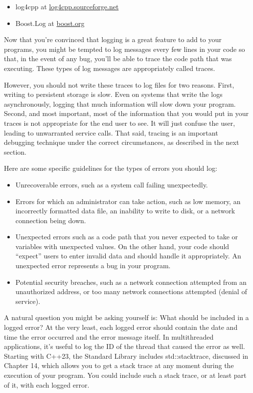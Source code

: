 \begin{itemize}
\item
log4cpp at \url{log4cpp.sourceforge.net}

\item
Boost.Log at \url{boost.org}
\end{itemize}

Now that you’re convinced that logging is a great feature to add to your programs, you might be tempted to log messages every few lines in your code so that, in the event of any bug, you’ll be able to trace the code path that was executing. These types of log messages are appropriately called traces.

However, you should not write these traces to log files for two reasons. First, writing to persistent storage is slow. Even on systems that write the logs asynchronously, logging that much information will slow down your program. Second, and most important, most of the information that you would put in your traces is not appropriate for the end user to see. It will just confuse the user, leading to unwarranted service calls. That said, tracing is an important debugging technique under the correct circumstances, as described in the next section.

Here are some specific guidelines for the types of errors you should log:

\begin{itemize}
\item
Unrecoverable errors, such as a system call failing unexpectedly.

\item
Errors for which an administrator can take action, such as low memory, an incorrectly formatted data file, an inability to write to disk, or a network connection being down.

\item
Unexpected errors such as a code path that you never expected to take or variables with unexpected values. On the other hand, your code should “expect” users to enter invalid data and should handle it appropriately. An unexpected error represents a bug in your program.

\item
Potential security breaches, such as a network connection attempted from an unauthorized address, or too many network connections attempted (denial of service).
\end{itemize}

A natural question you might be asking yourself is: What should be included in a logged error? At the very least, each logged error should contain the date and time the error occurred and the error message itself. In multithreaded applications, it’s useful to log the ID of the thread that caused the error as well. Starting with C++23, the Standard Library includes std::stacktrace, discussed in Chapter 14, which allows you to get a stack trace at any moment during the execution of your program. You could include such a stack trace, or at least part of it, with each logged error.

